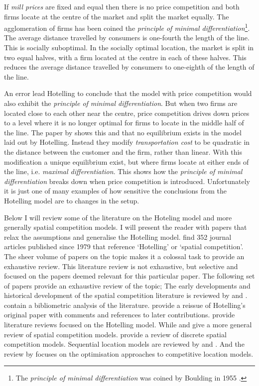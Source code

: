 \documentclass[preprint, 12pt]{elsarticle}
\begin{document}
If \emph{mill prices} are fixed and equal then there is no price competition and both firms locate at the centre of the market and split the market equally. The agglomeration of firms has been coined the \emph{principle of minimal differentiation}\footnote{The \emph{principle of minimal differentiation} was coined by Boulding in 1955 \citep{Biscaia_Mota_2013}.}. The average distance travelled by consumers is one-fourth the length of the line. This is socially suboptimal. In the socially optimal location, the market is split in two equal halves, with a firm located at the centre in each of these halves. This reduces the average distance travelled by consumers to one-eighth of the length of the line. 

An error lead Hotelling to conclude that the model with price competition would also exhibit the \emph{principle of minimal differentiation}. But when two firms are located close to each other near the centre, price competition drives down prices to a level where it is no longer optimal for firms to locate in the middle half of the line. The paper by \citet{dAspremont_Gabszewicz_Thisse_1979} shows this and that no equilibrium exists in the model laid out by Hotelling. Instead they modify \emph{transportation cost} to be quadratic in the distance between the customer and the firm, rather than linear. With this modification a unique equilibrium exist, but where firms locate at either ends of the line, i.e. \emph{maximal differentiation}. This shows how the \emph{principle of minimal differentiation} breaks down when price competition is introduced. Unfortunately it is just one of many examples of how sensitive the conclusions from the Hotelling model are to changes in the setup. 

Below I will review some of the literature on the Hoteling model and more generally spatial competition models. I will present the reader with papers that relax the assumptions and generalise the Hotelling model. \citet{Biscaia_Mota_2013} find 352 journal articles published since 1979 that reference `Hotelling' or `spatial competition'. The sheer volume of papers on the topic makes it a colossal task to provide an exhaustive review. This literature review is not exhaustive, but selective and focused on the papers deemed relevant for this particular paper. The following set of papers provide an exhaustive review of the topic; The early developments and historical development of the spatial competition literature is reviewed by \citet[chapter~1]{Eiselt_Marianov_2011} and \citet{Smith_Laporte_Harper_2009}. \citet{Biscaia_Mota_2013} contain a bibliometric analysis of the literature. \citet{Eiselt_2011} provide a reissue of Hotelling's original paper with comments and references to later contributions. \citet{Graitson_1982, Brenner_2001, Eiselt_Laporte_Thisse_1993} provide literature reviews focused on the Hotelling model. While \citet{Kilkenny_Thisse_1999} and \citet{ReVelle_Eiselt_2005} give a more general review of spatial competition models. \citet{Daskin_2008} provide a review of discrete spatial competition models. Sequential location models are reviewed by \citet{Eiselt_Laporte_1996} and \citet{Kress_Pesch_2012}. And the review by \citet{Plastria_2001} focuses on the optimisation approaches to competitive location models.
\end{document}
